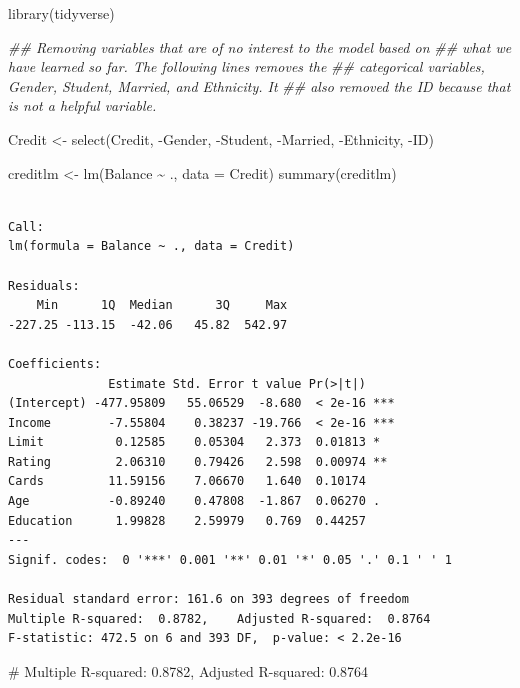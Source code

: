 \documentclass[
  letterpaper,
  DIV=11,
  numbers=noendperiod]{scrreprt}
\newenvironment{Shaded}{\begin{snugshade}}{\end{snugshade}}
\newcommand{\AttributeTok}[1]{\textcolor[rgb]{0.40,0.45,0.13}{#1}}
\newcommand{\CommentTok}[1]{\textcolor[rgb]{0.37,0.37,0.37}{#1}}
\newcommand{\DocumentationTok}[1]{\textcolor[rgb]{0.37,0.37,0.37}{\textit{#1}}}
\newcommand{\FunctionTok}[1]{\textcolor[rgb]{0.28,0.35,0.67}{#1}}
\newcommand{\NormalTok}[1]{\textcolor[rgb]{0.00,0.23,0.31}{#1}}
\newcommand{\OtherTok}[1]{\textcolor[rgb]{0.00,0.23,0.31}{#1}}
\newcommand{\SpecialCharTok}[1]{\textcolor[rgb]{0.37,0.37,0.37}{#1}}
\begin{document}
\begin{Shaded}
\begin{Highlighting}[]
\FunctionTok{library}\NormalTok{(tidyverse)}

\DocumentationTok{\#\# Removing variables that are of no interest to the model based on}
\DocumentationTok{\#\# what we have learned so far.  The following lines removes the}
\DocumentationTok{\#\# categorical variables, Gender, Student, Married, and Ethnicity. It}
\DocumentationTok{\#\# also removed the ID because that is not a helpful variable.}

\NormalTok{Credit }\OtherTok{\textless{}{-}} \FunctionTok{select}\NormalTok{(Credit, }\SpecialCharTok{{-}}\NormalTok{Gender, }\SpecialCharTok{{-}}\NormalTok{Student, }\SpecialCharTok{{-}}\NormalTok{Married, }\SpecialCharTok{{-}}\NormalTok{Ethnicity, }\SpecialCharTok{{-}}\NormalTok{ID)}

\NormalTok{creditlm }\OtherTok{\textless{}{-}} \FunctionTok{lm}\NormalTok{(Balance }\SpecialCharTok{\textasciitilde{}}\NormalTok{ ., }\AttributeTok{data =}\NormalTok{ Credit)}
\FunctionTok{summary}\NormalTok{(creditlm)}
\end{Highlighting}
\end{Shaded}

\begin{verbatim}

Call:
lm(formula = Balance ~ ., data = Credit)

Residuals:
    Min      1Q  Median      3Q     Max 
-227.25 -113.15  -42.06   45.82  542.97 

Coefficients:
              Estimate Std. Error t value Pr(>|t|)    
(Intercept) -477.95809   55.06529  -8.680  < 2e-16 ***
Income        -7.55804    0.38237 -19.766  < 2e-16 ***
Limit          0.12585    0.05304   2.373  0.01813 *  
Rating         2.06310    0.79426   2.598  0.00974 ** 
Cards         11.59156    7.06670   1.640  0.10174    
Age           -0.89240    0.47808  -1.867  0.06270 .  
Education      1.99828    2.59979   0.769  0.44257    
---
Signif. codes:  0 '***' 0.001 '**' 0.01 '*' 0.05 '.' 0.1 ' ' 1

Residual standard error: 161.6 on 393 degrees of freedom
Multiple R-squared:  0.8782,    Adjusted R-squared:  0.8764 
F-statistic: 472.5 on 6 and 393 DF,  p-value: < 2.2e-16
\end{verbatim}

\begin{Shaded}
\begin{Highlighting}[]
\CommentTok{\# Multiple R{-}squared: 0.8782, Adjusted R{-}squared: 0.8764}
\end{Highlighting}
\end{Shaded}
\end{document}
